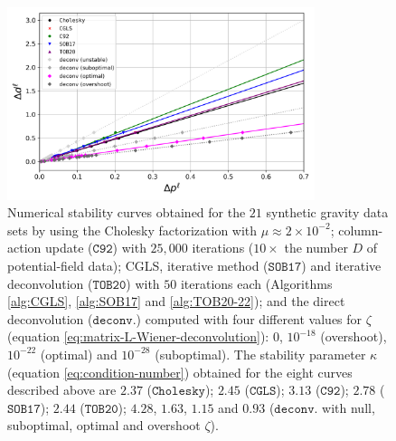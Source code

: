 \documentclass[utf8]{FrontiersinHarvard} %
\begin{document}
	\begin{figure}[htbp]
		\begin{center}
			\includegraphics[width=9cm]{Fig/stability-comparison}
		\end{center}
		\caption{
			Numerical stability curves obtained for the $21$ synthetic gravity data sets 
			by using the Cholesky factorization with $\mu \approx 2 \times 10^{-2}$; 
			column-action update ($\mathtt{C92}$) with $25,000$ iterations ($10 \times$ the number $D$ of potential-field data); 
			CGLS, iterative method ($\mathtt{SOB17}$) and iterative deconvolution
			($\mathtt{TOB20}$) with $50$ iterations each (Algorithms \ref{alg:CGLS}, \ref{alg:SOB17} and \ref{alg:TOB20-22}); 
			and the direct deconvolution ($\mathtt{deconv.}$) computed with four different values for $\zeta$ 
			(equation \ref{eq:matrix-L-Wiener-deconvolution}): $0$, $10^{-18}$ (overshoot), $10^{-22}$ (optimal)
			and $10^{-28}$ (suboptimal).
			The stability parameter $\kappa$ (equation \ref{eq:condition-number}) obtained for the eight curves described above are 
			$2.37$ ($\mathtt{Cholesky}$);
			$2.45$ ($\mathtt{CGLS}$);
			$3.13$ ($\mathtt{C92}$);
			$2.78$ ($\mathtt{SOB17}$); 
			$2.44$ ($\mathtt{TOB20}$); 
			$4.28$, $1.63$, $1.15$ and $0.93$ 
			($\mathtt{deconv.}$ with null, suboptimal, optimal and overshoot $\zeta$).
		}
		\label{fig:stability-comparison}
	\end{figure}
	
\end{document}
